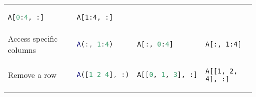 \documentclass[]{article}
\begin{document}
\begin{longtable}[]{@{}llll@{}}
\begin{minipage}[t]{0.23\columnwidth}
\begin{lstlisting}[language=Python]
A[0:4, :]
\end{lstlisting}
\strut
\end{minipage} & \begin{minipage}[t]{0.20\columnwidth}\raggedright\strut
\begin{lstlisting}
A[1:4, :]
\end{lstlisting}
\strut
\end{minipage}\tabularnewline
\begin{minipage}[t]{0.23\columnwidth}\raggedright\strut
Access specific columns\strut
\end{minipage} & \begin{minipage}[t]{0.23\columnwidth}\raggedright\strut
\begin{lstlisting}[language=Matlab]
A(:, 1:4)
\end{lstlisting}
\strut
\end{minipage} & \begin{minipage}[t]{0.23\columnwidth}\raggedright\strut
\begin{lstlisting}[language=Python]
A[:, 0:4]
\end{lstlisting}
\strut
\end{minipage} & \begin{minipage}[t]{0.20\columnwidth}\raggedright\strut
\begin{lstlisting}
A[:, 1:4]
\end{lstlisting}
\strut
\end{minipage}\tabularnewline
\begin{minipage}[t]{0.23\columnwidth}\raggedright\strut
Remove a row\strut
\end{minipage} & \begin{minipage}[t]{0.23\columnwidth}\raggedright\strut
\begin{lstlisting}[language=Matlab]
A([1 2 4], :)
\end{lstlisting}
\strut
\end{minipage} & \begin{minipage}[t]{0.23\columnwidth}\raggedright\strut
\begin{lstlisting}[language=Python]
A[[0, 1, 3], :]
\end{lstlisting}
\strut
\end{minipage} & \begin{minipage}[t]{0.20\columnwidth}\raggedright\strut
\begin{lstlisting}
A[[1, 2, 4], :]
\end{lstlisting}

\end{minipage}
\end{longtable}
\end{document}
